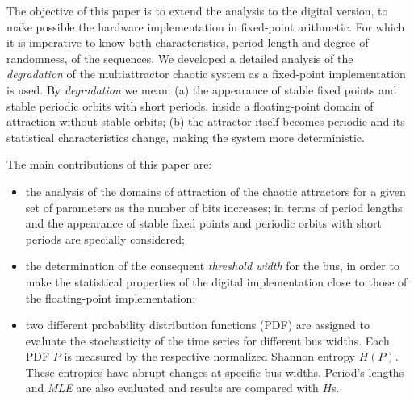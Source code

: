 The objective of this paper is to extend the analysis to the digital version, to make possible  the hardware implementation in fixed-point arithmetic.
For which it is imperative to know both characteristics, period length and degree of randomness, of the sequences.
We developed a detailed analysis of the \textsl{degradation} of the multiattractor chaotic system as a fixed-point implementation is used.
By \textsl{degradation} we mean:
(a) the appearance of stable fixed points and stable periodic orbits with short periods, inside a floating-point domain of attraction without stable orbits;
(b) the attractor itself becomes periodic and its statistical characteristics change, making the system more deterministic.

The main contributions of this paper are: 
\begin{itemize}
\item the analysis of the domains of attraction of the chaotic attractors for a given set of parameters as the number of bits increases; in terms of period lengths and the appearance of stable fixed points and periodic orbits with short periods are specially considered;
\item the determination of the consequent \textsl{threshold width} for the bus, in order to make the statistical properties of the digital implementation close to those of the floating-point implementation; 
\item  two different probability distribution functions (PDF) are assigned  to evaluate the stochasticity of the time series for different bus widths.
Each PDF  $P$ is measured by the respective normalized Shannon entropy $H(P)$.
These entropies have abrupt changes at specific bus widths.
Period's lengths and \textsl{MLE} are also evaluated and results are compared with $H$s.
\end{itemize}